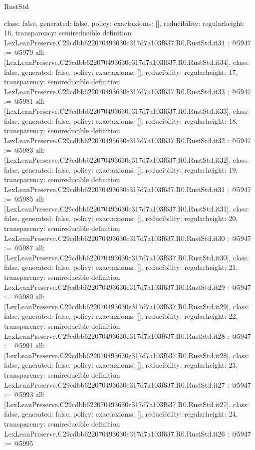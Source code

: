 \begin{lexlean}{RustStd}
\begin{coremodule}
{  class: false,
  generated: false,
  policy: exact{axioms: []},
  reducibility: regular{height: 16},
  transparency: semireducible
}
definition LexLeanPreserve.C29cdbb622070493630e317d7a103f637.R0.RustStd.it34 : @5947 := @5979 {
  all: [LexLeanPreserve.C29cdbb622070493630e317d7a103f637.R0.RustStd.it34],
  class: false,
  generated: false,
  policy: exact{axioms: []},
  reducibility: regular{height: 17},
  transparency: semireducible
}
definition LexLeanPreserve.C29cdbb622070493630e317d7a103f637.R0.RustStd.it33 : @5947 := @5981 {
  all: [LexLeanPreserve.C29cdbb622070493630e317d7a103f637.R0.RustStd.it33],
  class: false,
  generated: false,
  policy: exact{axioms: []},
  reducibility: regular{height: 18},
  transparency: semireducible
}
definition LexLeanPreserve.C29cdbb622070493630e317d7a103f637.R0.RustStd.it32 : @5947 := @5983 {
  all: [LexLeanPreserve.C29cdbb622070493630e317d7a103f637.R0.RustStd.it32],
  class: false,
  generated: false,
  policy: exact{axioms: []},
  reducibility: regular{height: 19},
  transparency: semireducible
}
definition LexLeanPreserve.C29cdbb622070493630e317d7a103f637.R0.RustStd.it31 : @5947 := @5985 {
  all: [LexLeanPreserve.C29cdbb622070493630e317d7a103f637.R0.RustStd.it31],
  class: false,
  generated: false,
  policy: exact{axioms: []},
  reducibility: regular{height: 20},
  transparency: semireducible
}
definition LexLeanPreserve.C29cdbb622070493630e317d7a103f637.R0.RustStd.it30 : @5947 := @5987 {
  all: [LexLeanPreserve.C29cdbb622070493630e317d7a103f637.R0.RustStd.it30],
  class: false,
  generated: false,
  policy: exact{axioms: []},
  reducibility: regular{height: 21},
  transparency: semireducible
}
definition LexLeanPreserve.C29cdbb622070493630e317d7a103f637.R0.RustStd.it29 : @5947 := @5989 {
  all: [LexLeanPreserve.C29cdbb622070493630e317d7a103f637.R0.RustStd.it29],
  class: false,
  generated: false,
  policy: exact{axioms: []},
  reducibility: regular{height: 22},
  transparency: semireducible
}
definition LexLeanPreserve.C29cdbb622070493630e317d7a103f637.R0.RustStd.it28 : @5947 := @5991 {
  all: [LexLeanPreserve.C29cdbb622070493630e317d7a103f637.R0.RustStd.it28],
  class: false,
  generated: false,
  policy: exact{axioms: []},
  reducibility: regular{height: 23},
  transparency: semireducible
}
definition LexLeanPreserve.C29cdbb622070493630e317d7a103f637.R0.RustStd.it27 : @5947 := @5993 {
  all: [LexLeanPreserve.C29cdbb622070493630e317d7a103f637.R0.RustStd.it27],
  class: false,
  generated: false,
  policy: exact{axioms: []},
  reducibility: regular{height: 24},
  transparency: semireducible
}
definition LexLeanPreserve.C29cdbb622070493630e317d7a103f637.R0.RustStd.it26 : @5947 := @5995 {
}
\end{coremodule}
\end{lexlean}
